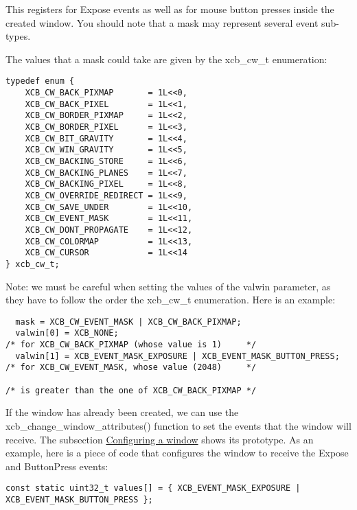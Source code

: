 \documentclass[12pt,oneside,titlepage]{book}
\begin{document}
\begin{enumerate}
\begin{enumerate}
    This registers for {Expose} events as well as for mouse button
    presses inside the created window. You should note that a mask may
    represent several event sub-types.

    The values that a mask could take are given by the {xcb\_cw\_t}
    enumeration:

\begin{verbatim}
typedef enum {
    XCB_CW_BACK_PIXMAP       = 1L<<0,
    XCB_CW_BACK_PIXEL        = 1L<<1,
    XCB_CW_BORDER_PIXMAP     = 1L<<2,
    XCB_CW_BORDER_PIXEL      = 1L<<3,
    XCB_CW_BIT_GRAVITY       = 1L<<4,
    XCB_CW_WIN_GRAVITY       = 1L<<5,
    XCB_CW_BACKING_STORE     = 1L<<6,
    XCB_CW_BACKING_PLANES    = 1L<<7,
    XCB_CW_BACKING_PIXEL     = 1L<<8,
    XCB_CW_OVERRIDE_REDIRECT = 1L<<9,
    XCB_CW_SAVE_UNDER        = 1L<<10,
    XCB_CW_EVENT_MASK        = 1L<<11,
    XCB_CW_DONT_PROPAGATE    = 1L<<12,
    XCB_CW_COLORMAP          = 1L<<13,
    XCB_CW_CURSOR            = 1L<<14
} xcb_cw_t;
\end{verbatim}

    Note: we must be careful when setting the values of the valwin
    parameter, as they have to follow the order the {xcb\_cw\_t}
    enumeration. Here is an example:

\begin{verbatim}
  mask = XCB_CW_EVENT_MASK | XCB_CW_BACK_PIXMAP;
  valwin[0] = XCB_NONE;                                              /* for XCB_CW_BACK_PIXMAP (whose value is 1)     */
  valwin[1] = XCB_EVENT_MASK_EXPOSURE | XCB_EVENT_MASK_BUTTON_PRESS; /* for XCB_CW_EVENT_MASK, whose value (2048)     */
                                                                     /* is greater than the one of XCB_CW_BACK_PIXMAP */
\end{verbatim}

    If the window has already been created, we can use the
    {xcb\_change\_window\_attributes()} function to set the events that
    the window will receive. The subsection
    \protect\hyperlink{winconf}{Configuring a window} shows its
    prototype. As an example, here is a piece of code that configures
    the window to receive the {Expose} and {ButtonPress} events:

\begin{verbatim}
const static uint32_t values[] = { XCB_EVENT_MASK_EXPOSURE | XCB_EVENT_MASK_BUTTON_PRESS };


\end{verbatim}
\end{enumerate}
\end{enumerate}
\end{document}
